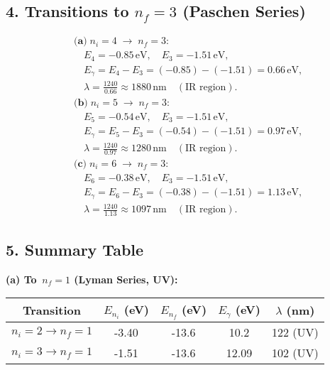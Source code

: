 \documentclass[12pt]{article}
\theoremstyle{definition} %
\theoremstyle{plain} %
\begin{document}
\subsection*{4. Transitions to \texorpdfstring{$n_f=3$}{n=3} (Paschen Series)}
\[
\begin{aligned}
&\textbf{(a)}\; n_i = 4 \;\longrightarrow\; n_f = 3: \\
&\quad E_{4} = -0.85\,\text{eV}, \quad E_{3} = -1.51\,\text{eV}, \\
&\quad E_{\gamma} = E_{4} - E_{3} = (-0.85) - (-1.51) = 0.66\,\text{eV}, \\
&\quad \lambda = \frac{1240}{0.66} \approx 1880\,\text{nm} \quad (\text{IR region}). \\[6pt]
&\textbf{(b)}\; n_i = 5 \;\longrightarrow\; n_f = 3: \\
&\quad E_{5} = -0.54\,\text{eV}, \quad E_{3} = -1.51\,\text{eV}, \\
&\quad E_{\gamma} = E_{5} - E_{3} = (-0.54) - (-1.51) = 0.97\,\text{eV}, \\
&\quad \lambda = \frac{1240}{0.97} \approx 1280\,\text{nm} \quad (\text{IR region}). \\[6pt]
&\textbf{(c)}\; n_i = 6 \;\longrightarrow\; n_f = 3: \\
&\quad E_{6} = -0.38\,\text{eV}, \quad E_{3} = -1.51\,\text{eV}, \\
&\quad E_{\gamma} = E_{6} - E_{3} = (-0.38) - (-1.51) = 1.13\,\text{eV}, \\
&\quad \lambda = \frac{1240}{1.13} \approx 1097\,\text{nm} \quad (\text{IR region}).
\end{aligned}
\]

\subsection*{5. Summary Table}

\noindent
\textbf{(a) To \(\,n_f = 1\) (Lyman Series, UV):}

\begin{tabular}{|c|c|c|c|c|}
\hline
Transition & $E_{n_i}$ (eV) & $E_{n_f}$ (eV) & $E_\gamma$ (eV) & $\lambda$ (nm) \\ \hline
$n_i=2 \to n_f=1$ & -3.40 & -13.6 & 10.2 & 122 (UV) \\ \hline
$n_i=3 \to n_f=1$ & -1.51 & -13.6 & 12.09 & 102 (UV) \\ \hline
\end{tabular}

\vspace{0.5cm}
\end{document}
